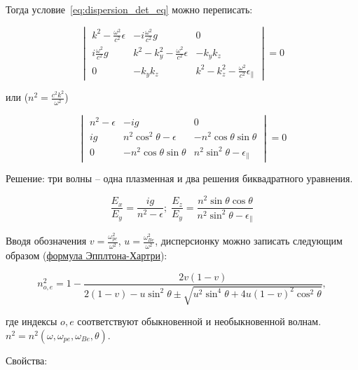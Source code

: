 \documentclass[10pt, a4paper]{article}
\begin{document}
Тогда условие~\eqref{eq:dispersion_det_eq} можно переписать:

\begin{equation*}
	\begin{vmatrix}
		k^2-\frac{\omega^2}{c^2}\epsilon & -i\frac{\omega^2}{c^2}g & 0 \\
		i\frac{\omega^2}{c^2}g & k^2-k_y^2- \frac{\omega^2}{c^2}\epsilon & -k_yk_z \\
		0 & -k_yk_z & k^2-k_z^2- \frac{\omega^2}{c^2}\epsilon_\parallel
	\end{vmatrix}=0
\end{equation*}

или ($n^2=\frac{c^2 k^2}{\omega^2}$)

\begin{equation*}
	\begin{vmatrix}
		n^2-\epsilon & -ig & 0 \\
		ig & n^2\cos^2\theta-\epsilon & -n^2\cos\theta\sin\theta \\
		0 & -n^2\cos\theta\sin\theta & n^2\sin^2\theta-\epsilon_\parallel
	\end{vmatrix}=0
\end{equation*}

Решение: три волны -- одна плазменная и два решения биквадратного уравнения.

\begin{equation*}
	\frac{E_x}{E_y}=\frac{ig}{n^2-\epsilon};\;\frac{E_z}{E_y}=\frac{n^2\sin\theta\cos\theta}{n^2\sin^2\theta-\epsilon_\parallel}
\end{equation*}

Вводя обозначения $v=\frac{\omega_{pe}^2}{\omega^2}$, $u=\frac{\omega_{Be}^2}{\omega^2}$, дисперсионку можно записать следующим образом (\uline{формула Эпплтона-Хартри}):

\begin{equation} \label{eq:Appleton_Hartree_eq}
	n_{o,e}^2=1-\frac{2v(1-v)}{2(1-v)-u\sin^2\theta \pm \sqrt{u^2 \sin^4\theta+4u(1-v)^2 \cos^2\theta}}, 
\end{equation}

где индексы $o, e$ соответствуют обыкновенной и необыкновенной волнам. $n^2=n^2(\omega,\omega_{pe},\omega_{Be},\theta)$. 

Свойства:
\end{document}
